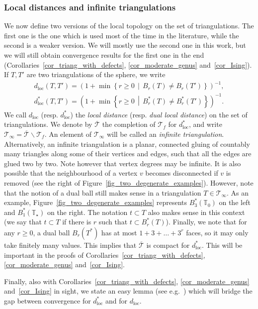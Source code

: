 \documentclass[10pt]{amsart}
\theoremstyle{definition}\newtheorem{defi}[theo]{Definition}\newtheorem{rema}[theo]{Remark}\newtheorem{exam}[theo]{Example}\newtheorem{exem}[theo]{Example}\newtheorem{nota}[theo]{Notation}
\newcommand{\loc}{\mathrm{loc}}
\newcommand{\T}{\mathcal{T}}
\newcommand{\TT}{\mathbb{T}}
\begin{document}
\subsubsection*{Local distances and infinite triangulations}
We now define two versions of the local topology on the set of triangulations. The first one is the one which is used most of the time in the literature, while the second is a weaker version. We will mostly use the second one in this work, but we will still obtain convergence results for the first one in the end (Corollaries~\ref{cor_triang_with_defects}, \ref{cor_moderate_genus} and~\ref{cor_Ising}). If $T,T'$ are two triangulations of the sphere, we write
\begin{align*}
d_{\loc}(T,T') = \left(1+\min \left\{ r \geq 0 \,\middle|\, B_r(T) \ne B_r(T') \right\}\right)^{-1},
\\
d_{\loc}^*(T,T') = \left(1+\min \left\{ r \geq 0 \,\middle|\, B_r^*(T) \ne B_r^*(T') \right\}\right)^{-1}.
\end{align*}
We call $d_{\loc}$ (resp. $d^*_{\loc}$) the \emph{local distance} (resp. \emph{dual local distance}) on the set of triangulations. We denote by $\overline{\T}$ the completion of $\T_f$ for $d^*_{\loc}$, and write $\T_{\infty} = \overline{\T} \backslash \T_f$. An element of $\T_{\infty}$ will be called an \emph{infinite triangulation}. Alternatively, an infinite triangulation is a planar, connected gluing of countably many triangles along some of their vertices and edges, such that all the edges are glued two by two. Note however that vertex degrees may be infinite. It is also possible that the neighbourhood of a vertex $v$ becomes disconnected if $v$ is removed (see the right of Figure~\ref{fig_two_degenerate_examples}). However, note that the notion of a dual ball still makes sense in a triangulation $T \in \T_{\infty}$. As an example, Figure~\ref{fig_two_degenerate_examples} represents $B^*_3(\TT_0)$ on the left and $B_1^*(\TT_{\star})$ on the right. The notation $t \subset T$ also makes sense in this context (we say that $t \subset T$ if there is $r$ such that $t \subset B_r^*(T)$). Finally, we note that for any $r \geq 0$, a dual ball $B_r(T^*)$ has at most $1+3+\dots+3^r$ faces, so it may only take finitely many values. This implies that $\overline{\T}$ is compact for $d_{\loc}^*$. This will be important in the proofs of Corollaries~\ref{cor_triang_with_defects}, \ref{cor_moderate_genus} and~\ref{cor_Ising}.

Finally, also with Corollaries~\ref{cor_triang_with_defects}, \ref{cor_moderate_genus} and~\ref{cor_Ising} in sight, we state an easy lemma (see e.g.~\cite[Lemma~3]{BL19}) which will bridge the gap between convergence for $d^*_{\loc}$ and for $d_{\loc}$.
\end{document}
